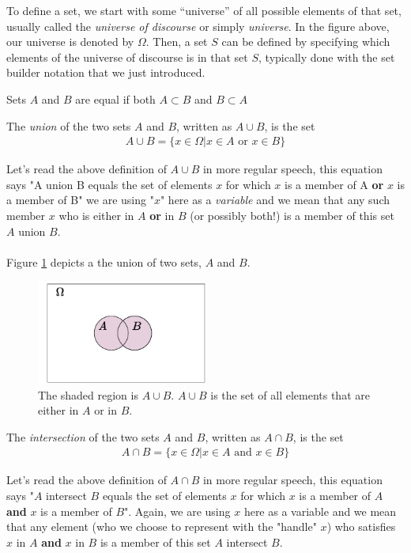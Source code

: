 To define a set, we start with some “universe” of all possible elements of that set, usually called the \textit{universe of discourse} or simply \textit{universe}. In the figure above, our universe is denoted by $\Omega$. Then, a set $S$ can be defined by specifying which elements of the universe of discourse is in that set $S$, typically done with the set builder notation that we just introduced.
\begin{definition}
Sets $A$ and $B$ are equal if both $A\subset B$ and $B\subset A$
\end{definition}

\begin{definition} \index{$\cup$}
The \textit{union} of the two sets $A$ and $B$, written as $A\cup B$, is the set
\begin{align}
    A\cup B = \{x\in \Omega |x\in A \text{ or } x\in B \} \nonumber
\end{align}
\end{definition}
Let's read the above definition of $A\cup B$ in more regular speech, this equation says "A union B equals the set of elements $x$ for which $x$ is a member of A \textbf{or} $x$ is a member of B" we are using "$x$" here as a \textit{variable} and we mean that any such member $x$ who is either in $A$ \textbf{or} in $B$ (or possibly both!) is a member of this set $A$ union $B$. \\ \\
Figure \ref{fig:set_union_example} depicts a the union of two sets, $A$ and $B$.
\begin{figure}[h!]
    \centering
    \includegraphics[width=0.5\textwidth]{Figures/Set_Union.pdf}
    \caption{The shaded region is $A\cup B$. $A\cup B$ is the set of all elements that are either in $A$ or in $B$.}
    \label{fig:set_union_example}
\end{figure}
\begin{definition}\index{$\cap$}
The \textit{intersection} of the two sets $A$ and $B$, written as $A\cap B$, is the set
\begin{align}
    A\cap B=\{x \in \Omega |x\in A \text{ and } x\in B \} \nonumber
\end{align}
\end{definition}
Let's read the above definition of $A\cap B$ in more regular speech, this equation says "$A$ intersect $B$ equals the set of elements $x$ for which $x$ is a member of $A$ \textbf{and} $x$ is a member of $B$". Again, we are using $x$ here as a variable and we mean that any element (who we choose to represent with the "handle" $x$) who satisfies $x$ in $A$ \textbf{and} $x$ in $B$ is a member of this set $A$ intersect $B$.\\ \\

